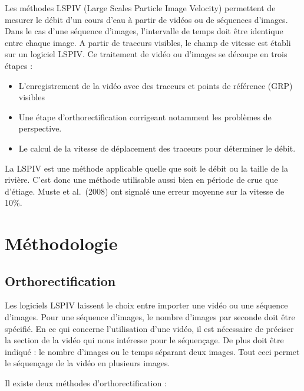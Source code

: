 \documentclass[
]{article}
\providecommand{\tightlist}{%
  \setlength{\itemsep}{0pt}\setlength{\parskip}{0pt}}
\begin{document}
Les méthodes LSPIV (Large Scales Particle Image Velocity) permettent de mesurer le débit d'un cours d'eau à partir de vidéos ou de séquences d'images. Dans le cas d'une séquence d'images, l'intervalle de temps doit être identique entre chaque image. A partir de traceurs visibles, le champ de vitesse est établi sur un logiciel LSPIV. Ce traitement de vidéo ou d'images se découpe en trois étapes :

\begin{itemize}
\tightlist
\item
  L'enregistrement de la vidéo avec des traceurs et points de référence (GRP) visibles
\item
  Une étape d'orthorectification corrigeant notamment les problèmes de perspective.
\item
  Le calcul de la vitesse de déplacement des traceurs pour déterminer le débit.
\end{itemize}

La LSPIV est une méthode applicable quelle que soit le débit ou la taille de la rivière. C'est donc une méthode utilisable aussi bien en période de crue que d'étiage. Muste et al.~(2008) ont signalé une erreur moyenne sur la vitesse de 10\%.

\hypertarget{principle}{%
\section{Méthodologie}\label{principle}}

\hypertarget{orthorectification}{%
\subsection{Orthorectification}\label{orthorectification}}

Les logiciels LSPIV laissent le choix entre importer une vidéo ou une séquence d'images.
Pour une séquence d'images, le nombre d'images par seconde doit être spécifié.
En ce qui concerne l'utilisation d'une vidéo, il est nécessaire de préciser la section de la vidéo qui nous intéresse pour le séquençage. De plus doit être indiqué : le nombre d'images ou le temps séparant deux images. Tout ceci permet le séquençage de la vidéo en plusieurs images.

Il existe deux méthodes d'orthorectification :
\end{document}
